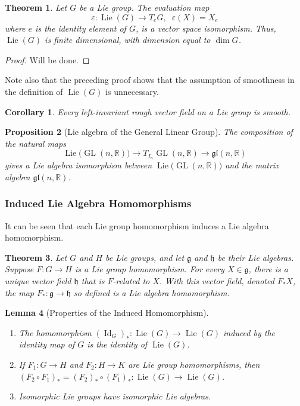 \documentclass{article}
\DeclareMathOperator{\GL}{GL}
\DeclareMathOperator{\Id}{Id}
\DeclareMathOperator{\Lie}{Lie}
\newtheorem{theorem}{Theorem}[section]
\newtheorem{proposition}[theorem]{Proposition}
\newtheorem{lemma}[theorem]{Lemma}
\newtheorem{corollary}{Corollary}[theorem]
\theoremstyle{remark}
\theoremstyle{definition}
\begin{document}
\begin{theorem}
Let $G$ be a Lie group. The evaluation map 
\[\varepsilon: \Lie(G) \longrightarrow T_e G, \;\; \varepsilon(X) = X_e \]
where $e$ is the identity element of $G$, is a vector space isomorphism. Thus, $\Lie(G)$ is finite dimensional, with dimension equal to $\dim{G}$. 
\end{theorem}
\begin{proof}
Will be done. 
\end{proof}

Note also that the preceding proof shows that the assumption of smoothness in the definition of $\Lie(G)$ is unnecessary. 

\begin{corollary}
Every left-invariant rough vector field on a Lie group is smooth. 
\end{corollary}

\begin{proposition}[Lie algebra of the General Linear Group]
The composition of the natural maps
\[\Lie \big( \GL(n, \mathbb{R}) \big) \rightarrow T_{I_n} \GL(n, \mathbb{R}) \rightarrow \mathfrak{gl}(n, \mathbb{R})\]
gives a Lie algebra isomorphism between $\Lie\big(\GL(n, \mathbb{R})\big)$ and the matrix algebra $\mathfrak{gl}(n, \mathbb{R})$. 
\end{proposition}

\subsubsection{Induced Lie Algebra Homomorphisms}

It can be seen that each Lie group homomorphism induces a Lie algebra homomorphism. 

\begin{theorem}
Let $G$ and $H$ be Lie groups, and let $\mathfrak{g}$ and $\mathfrak{h}$ be their Lie algebras. Suppose $F: G \longrightarrow H$ is a Lie group homomorphism. For every $X \in \mathfrak{g}$, there is a unique vector field $\mathfrak{h}$ that is $F$-related to $X$. With this vector field, denoted $F_* X$, the map $F_*: \mathfrak{g} \longrightarrow \mathfrak{h}$ so defined is a Lie algebra homomorphism. 
\end{theorem}

\begin{lemma}[Properties of the Induced Homomorphism]
\begin{enumerate}
    \item The homomorphism $(\Id_G)_* : \Lie (G) \longrightarrow \Lie(G)$ induced by the identity map of $G$ is the identity of $\Lie(G)$. 
    \item If $F_1: G \longrightarrow H$ and $F_2: H \longrightarrow K$ are Lie group homomorphisms, then $(F_2 \circ F_1)_* = (F_2)_* \circ (F_1)_* : \Lie(G) \longrightarrow \Lie(G)$. 
    \item Isomorphic Lie groups have isomorphic Lie algebras. 
\end{enumerate}
\end{lemma}
\end{document}
